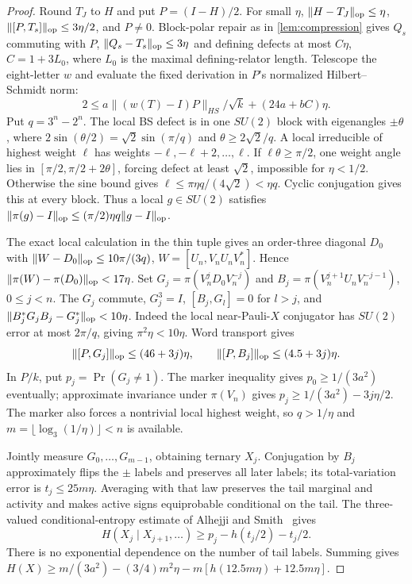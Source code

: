 \begin{proof}
Round $T_J$ to $H$ and put $P=(I-H)/2$. For small $\eta$, $\lVert H-T_J\rVert_{\mathrm{op}}\le\eta$, $\lVert [P,T_s]\rVert_{\mathrm{op}}\le3\eta/2$, and $P\ne0$. Block-polar repair as in \cref{lem:compression} gives $Q_s$ commuting with $P$, $\lVert Q_s-T_s\rVert_{\mathrm{op}}\le3\eta$ and defining defects at most $C\eta$, $C=1+3L_0$, where $L_0$ is the maximal defining-relator length. Telescope the eight-letter $w$ and evaluate the fixed derivation in $P$'s normalized Hilbert--Schmidt norm:
\[
 2\le a\|(w(T)-I)P\|_{HS}/\sqrt k+(24a+bC)\eta.
\]
Put $q=3^n-2^n$. The local BS defect is in one $SU(2)$ block with eigenangles $\pm\theta$, where $2\sin(\theta/2)=\sqrt2\sin(\pi/q)$ and $\theta\ge2\sqrt2/q$. A local irreducible of highest weight $\ell$ has weights $-\ell,-\ell+2,\ldots,\ell$. If $\ell\theta\ge\pi/2$, one weight angle lies in $[\pi/2,\pi/2+2\theta]$, forcing defect at least $\sqrt2$, impossible for $\eta<1/2$. Otherwise the sine bound gives $\ell\le\pi\eta q/(4\sqrt2)<\eta q$. Cyclic conjugation gives this at every block. Thus a local $g\in SU(2)$ satisfies $\lVert \pi(g)-I\rVert_{\mathrm{op}}\le(\pi/2)\eta q\lVert g-I\rVert_{\mathrm{op}}$.

The exact local calculation in the thin tuple gives an order-three diagonal $D_0$ with $\lVert W-D_0\rVert_{\mathrm{op}}\le10\pi/(3q)$, $W=[U_n,V_nU_nV_n^*]$. Hence $\lVert \pi(W)-\pi(D_0)\rVert_{\mathrm{op}}<17\eta$. Set $G_j=\pi(V_n^jD_0V_n^{-j})$ and $B_j=\pi(V_n^{j+1}U_nV_n^{-j-1})$, $0\le j<n$. The $G_j$ commute, $G_j^3=I$, $[B_j,G_l]=0$ for $l>j$, and $\lVert B_j^*G_jB_j-G_j^*\rVert_{\mathrm{op}}<10\eta$. Indeed the local near-Pauli-$X$ conjugator has $SU(2)$ error at most $2\pi/q$, giving $\pi^2\eta<10\eta$. Word transport gives
\[
 \lVert [P,G_j]\rVert_{\mathrm{op}}\le(46+3j)\eta,\qquad \lVert [P,B_j]\rVert_{\mathrm{op}}\le(4.5+3j)\eta.
\]
In $P/k$, put $p_j=\Pr(G_j\ne1)$. The marker inequality gives $p_0\ge1/(3a^2)$ eventually; approximate invariance under $\pi(V_n)$ gives $p_j\ge1/(3a^2)-3j\eta/2$. The marker also forces a nontrivial local highest weight, so $q>1/\eta$ and $m=\lfloor\log_3(1/\eta)\rfloor<n$ is available.

Jointly measure $G_0,\ldots,G_{m-1}$, obtaining ternary $X_j$. Conjugation by $B_j$ approximately flips the $\pm$ labels and preserves all later labels; its total-variation error is $t_j\le25m\eta$. Averaging with that law preserves the tail marginal and activity and makes active signs equiprobable conditional on the tail. The three-valued conditional-entropy estimate of Alhejji and Smith~\cite{AS20} gives
\[
 H(X_j\mid X_{j+1},\ldots)\ge p_j-h(t_j/2)-t_j/2.
\]
There is no exponential dependence on the number of tail labels. Summing gives $H(X)\ge m/(3a^2)-(3/4)m^2\eta-m[h(12.5m\eta)+12.5m\eta]$.


\end{proof}
